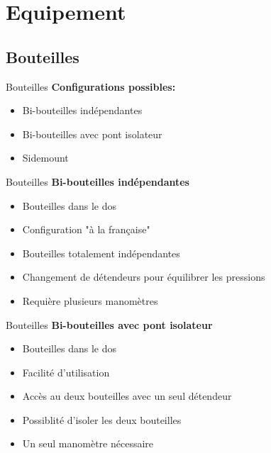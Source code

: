 
\section{Equipement}

\subsection{Bouteilles}

\begin{frame}{Bouteilles}
	\textbf{Configurations possibles:}
	\begin{itemize}
		\item Bi-bouteilles indépendantes
		\item Bi-bouteilles avec pont isolateur
		\item Sidemount
	\end{itemize}
\end{frame}

\begin{frame}{Bouteilles}  
	\textbf{Bi-bouteilles indépendantes}
	\begin{itemize}
		\item Bouteilles dans le dos
		\item Configuration "à la française"
		\item Bouteilles totalement indépendantes
		\item Changement de détendeurs pour équilibrer les pressions
		\item Requière plusieurs manomètres
	\end{itemize}
\end{frame}

\begin{frame}{Bouteilles}  
	\textbf{Bi-bouteilles avec pont isolateur}
	\begin{itemize}
		\item Bouteilles dans le dos
		\item Facilité d'utilisation
		\item Accès au deux bouteilles avec un seul détendeur
		\item Possiblité d'isoler les deux bouteilles
		\item Un seul manomètre nécessaire
	\end{itemize}
\end{frame}

